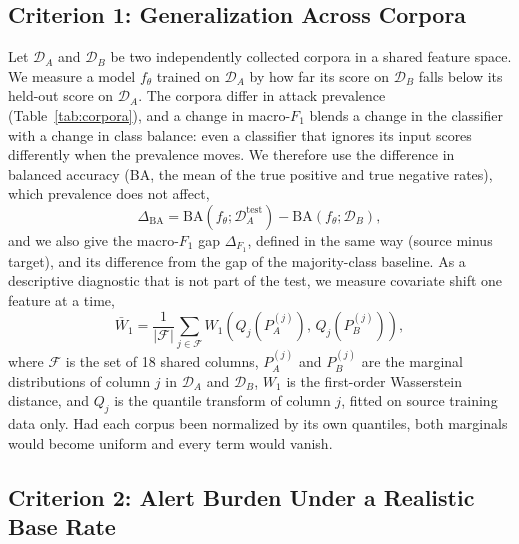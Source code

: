 \documentclass{ieeeaccess}
\newcommand{\DA}{\ensuremath{\mathcal{D}_{A}}}
\newcommand{\DB}{\ensuremath{\mathcal{D}_{B}}}
\begin{document}
\subsection{Criterion 1: Generalization Across Corpora}

Let \DA{} and \DB{} be two independently collected corpora in a shared feature space. We measure a model $f_{\theta}$ trained on \DA{} by how far its score on \DB{} falls below its held-out score on \DA{}. The corpora differ in attack prevalence (Table~\ref{tab:corpora}), and a change in macro-$F_1$ blends a change in the classifier with a change in class balance: even a classifier that ignores its input scores differently when the prevalence moves. We therefore use the difference in balanced accuracy (BA, the mean of the true positive and true negative rates), which prevalence does not affect,
\begin{equation}
\Delta_{\mathrm{BA}} = \mathrm{BA}\!\left(f_{\theta};\mathcal{D}_{A}^{\mathrm{test}}\right) - \mathrm{BA}\!\left(f_{\theta};\mathcal{D}_{B}\right),
\label{eq:gap}
\end{equation}
and we also give the macro-$F_1$ gap $\Delta_{F_1}$, defined in the same way (source minus target), and its difference from the gap of the majority-class baseline. As a descriptive diagnostic that is not part of the test, we measure covariate shift one feature at a time,
\begin{equation}
\bar{W}_{1} = \frac{1}{|\mathcal{F}|}\sum_{j \in \mathcal{F}} W_{1}\!\left(Q_{j}(P_{A}^{(j)}),\, Q_{j}(P_{B}^{(j)})\right),
\label{eq:shift}
\end{equation}
where $\mathcal{F}$ is the set of 18 shared columns, $P_{A}^{(j)}$ and $P_{B}^{(j)}$ are the marginal distributions of column $j$ in \DA{} and \DB{}, $W_{1}$ is the first-order Wasserstein distance, and $Q_{j}$ is the quantile transform of column $j$, fitted on source training data only. Had each corpus been normalized by its own quantiles, both marginals would become uniform and every term would vanish.

\subsection{Criterion 2: Alert Burden Under a Realistic Base Rate}
\end{document}
